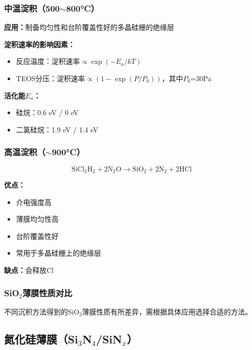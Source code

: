 \documentclass[UTF8,12pt,a4paper]{ctexart}
\begin{document}
\subsubsection{中温淀积（500$\sim$800°C）}

\textbf{应用：}制备均匀性和台阶覆盖性好的多晶硅栅的绝缘层

\textbf{淀积速率的影响因素：}
\begin{itemize}
    \item 反应温度：$\text{淀积速率} \propto \exp(-E_a/kT)$
    \item TEOS分压：$\text{淀积速率} \propto (1-\exp(P/P_0))$，其中$P_0$=30Pa
\end{itemize}

\textbf{活化能$E_a$：}
\begin{itemize}
    \item 硅烷：0.6 eV / 0 eV
    \item 二氯硅烷：1.9 eV / 1.4 eV
\end{itemize}

\subsubsection{高温淀积（$\sim$900°C）}

\begin{equation}
\text{SiCl}_2\text{H}_2 + 2\text{N}_2\text{O} \rightarrow \text{SiO}_2 + 2\text{N}_2 + 2\text{HCl}
\end{equation}

\textbf{优点：}
\begin{itemize}
    \item 介电强度高
    \item 薄膜均匀性高
    \item 台阶覆盖性好
    \item 常用于多晶硅栅上的绝缘层
\end{itemize}

\textbf{缺点：}会释放Cl

\subsubsection{SiO$_2$薄膜性质对比}

不同沉积方法得到的SiO$_2$薄膜性质有所差异，需根据具体应用选择合适的方法。

\subsection{氮化硅薄膜（Si$_3$N$_4$/SiN$_x$）}
\end{document}
